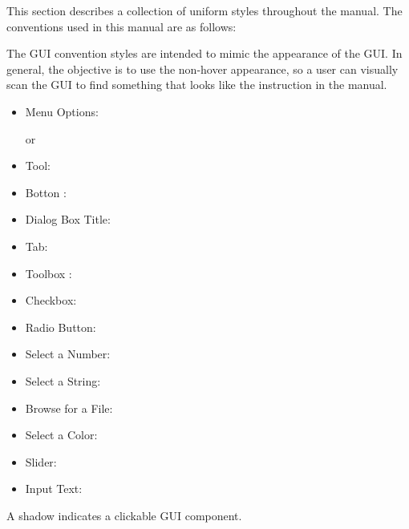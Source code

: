 

\label{label_conventions}

This section describes a collection of uniform styles throughout the manual. The conventions used in this manual are as follows:


The GUI convention styles are intended to mimic the appearance of the GUI. In general, the objective is to use the non-hover appearance, so a user can visually scan the GUI to find something that looks like the instruction in the manual.

\begin{itemize}[label=--,itemsep=5pt]
\item Menu Options:  \arrow
{}

or

 \arrow
{} \arrow {}
\item Tool: 
\item Botton : 
\item Dialog Box Title: 
\item Tab: 

\item Toolbox : 
\item Checkbox: 
\item Radio Button:   
\item Select a Number: 
\item Select a String: 
\item Browse for a File: \browsebutton
\item Select a Color: 
\item Slider: 
\item Input Text: 
\end{itemize}
A shadow indicates a clickable GUI component.


